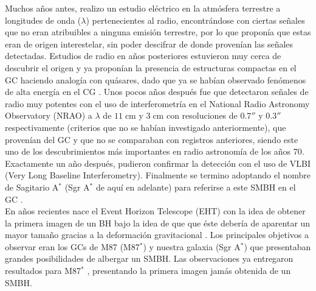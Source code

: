 \documentclass[11pt,letterpaper]{article}
\begin{document}
\begin{multicols}{2}
Muchos años antes, \cite{jansky1933electrical} realizo un estudio eléctrico en la atmósfera terrestre a longitudes de onda ($\lambda$) pertenecientes al radio, encontrándose con ciertas señales que no eran atribuibles a ninguna emisión terrestre, por lo que proponía que estas eran de origen interestelar, sin poder descifrar de donde provenían las señales detectadas. Estudios de radio en años posteriores estuvieron muy cerca de descubrir el origen \citep{clark, minley} y ya proponían la presencia de estructuras compactas en el GC haciendo analogía con quásares, dado que ya se habían observado fenómenos de alta energía en el CG \citep{lynden, lyndenress}. Unos pocos años después fue que \cite{balick1974intense} detectaron señales de radio muy potentes con el uso de interferometría en el National Radio Astronomy Observatory (NRAO) a $\lambda$ de $11\;\text{cm}$ y $3\;\text{cm}$ con resoluciones de $0.7''$ y $0.3''$ respectivamente (criterios que no se habían investigado anteriormente), que provenían del GC y que no se comparaban con registros anteriores, siendo este uno de los descubrimientos más importantes en radio astronomía de los años 70. Exactamente un año después, \cite{lo1} pudieron confirmar la detección con el uso de VLBI (Very Long Baseline Interferometry). Finalmente se termino adoptando el nombre de Sagitario A$^*$ (Sgr A$^*$ de aquí en adelante) para referirse a este SMBH en el GC \citep{brownestrella}.\\
En años recientes nace el Event Horizon Telescope (EHT) con la idea de obtener la primera imagen de un BH bajo la idea de que que éste debería de aparentar un mayor tamaño gracias a la deformación gravitacional \citep{campbell}. Los principales objetivos a observar eran los GCs de M87 (M87$^*$) y nuestra galaxia (Sgr A$^*$) que presentaban grandes posibilidades de albergar un SMBH. Las observaciones ya entregaron resultados para M87$^*$ \citep{2019ApJ...875L...2E}, presentando la primera imagen jamás obtenida de un SMBH.


\end{multicols}
\end{document}
